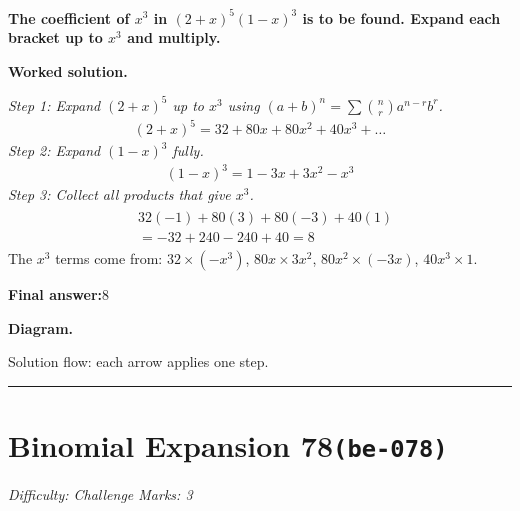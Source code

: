 \documentclass[11pt]{article}
\newcommand{\question}[1]{\par\medskip\noindent\textbf{#1}\par}
\begin{document}
\question{The coefficient of \( x^3 \) in \( (2 + x)^5(1 - x)^3 \) is to be found. Expand each bracket up to \( x^3 \) and multiply.}

\textbf{Worked solution.}

\textit{Step 1: Expand \((2+x)^5\) up to \(x^3\) using \((a+b)^n = \sum \binom{n}{r} a^{n-r} b^r\).}
\[\begin{gathered}
(2+x)^5 = 32 + 80x + 80x^2 + 40x^3 + \ldots
\end{gathered}\]
\textit{Step 2: Expand \((1-x)^3\) fully.}
\[\begin{gathered}
(1-x)^3 = 1 - 3x + 3x^2 - x^3
\end{gathered}\]
\textit{Step 3: Collect all products that give \(x^3\).}
\[\begin{gathered}
\begin{aligned} &32(-1) + 80(3) + 80(-3) + 40(1) \\ &= -32 + 240 - 240 + 40 = 8 \end{aligned}
\end{gathered}\]
The \(x^3\) terms come from: \(32 \times (-x^3)\), \(80x \times 3x^2\), \(80x^2 \times (-3x)\), \(40x^3 \times 1\).

\begin{answerbox}
\textbf{Final answer:}\quad \(\displaystyle 8\)
\end{answerbox}
\textbf{Diagram.}

\begin{center}
\end{center}
\small Solution flow: each arrow applies one step.\normalsize

\medskip\hrule

\section*{Binomial Expansion 78\quad\small\texttt{(be-078)}}
\textit{Difficulty: Challenge \quad\textbar\quad Marks: 3}
\end{document}
